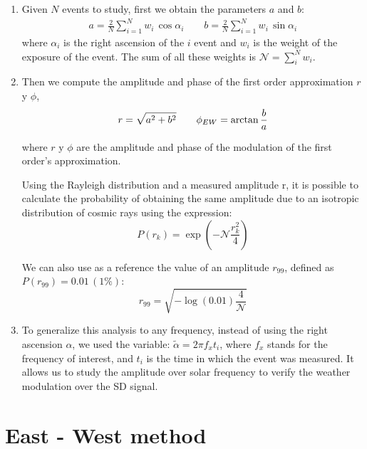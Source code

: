 \documentclass[12pt, doublespace, oneside]{article}
\begin{document}
\begin{enumerate}
    \item Given $N$ events to study, first we obtain the parameters $a$ and $b$:
    \begin{align}
        a = \frac{2}{N} \sum^N_{i=1}w_i\,\cos{\alpha_i} \qquad
        b = \frac{2}{N} \sum^N_{i=1}w_i\,\sin{\alpha_i} 
    \end{align}
    where $\alpha_i$  is the right ascension of the $i$ event and $w_i$ is the  weight of the exposure of the  event. The sum of all these weights is $\mathcal{N}=\sum^N_i w_i$.
    \item Then we compute the amplitude and phase of the first order approximation $r$ y $\phi$,
        \begin{align}
            r = \sqrt{a^2 + b^2} \qquad
            \phi_{EW} = \arctangent{\frac{b}{a} }
        \end{align}

      where  $r$ y $\phi$ are the amplitude and phase of the modulation of the first order's approximation.

      Using the Rayleigh distribution and a measured amplitude r,  it is possible to calculate the probability of obtaining the same amplitude due to an isotropic distribution of cosmic rays using the expression:
      \begin{equation}
        P({r}_k)= \exp(-\mathcal{N}\frac{{r}_k^2}{4})
      \end{equation}

      We can also use as a reference the value of an amplitude $r_{99}$, defined as $P(r_{99}) = 0.01\, (1\%)$:
      \begin{equation}
          r_{99} = \sqrt{-\log(0.01)\frac{4}{\mathcal{N}}}
      \end{equation}

      \item To generalize this analysis to any frequency, instead of using the right ascension $\alpha$, we used the variable:
      $\tilde{\alpha} = 2\pi f_x t_i $, where $f_x$ stands for the  frequency  of interest, and $t_i$ is the time in which the event was measured. It allows us to study the amplitude over solar frequency to verify the weather modulation over the SD signal.
      
\end{enumerate}

\section{East - West method}
\end{document}
